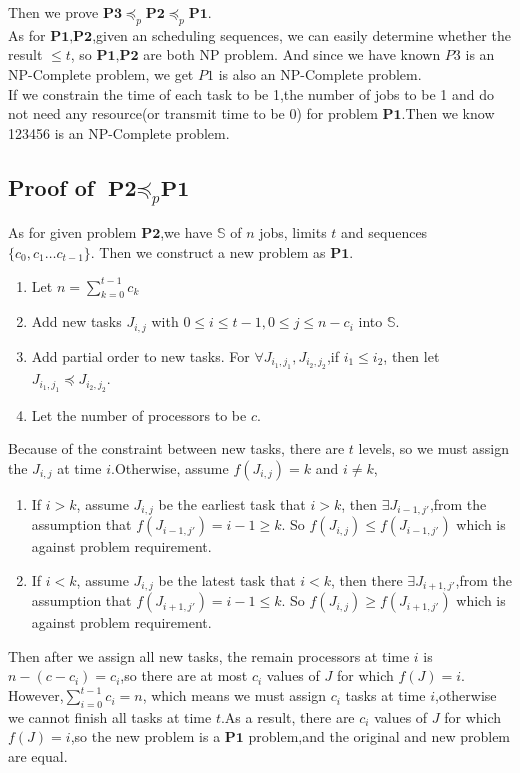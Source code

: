  Then we prove $\textbf{P3}\preceq_p \textbf{P2}\preceq_p\textbf{P1}$.\\As for $\textbf{P1,P2}$,given an scheduling sequences, we can easily determine whether the result $\le t$, so $\textbf{P1,P2}$ are both NP problem. And since we have known $P3$ is an NP-Complete problem, we get $P1$ is also an NP-Complete problem.\\
 If we constrain the time of each task to be 1,the number of jobs to be 1 and do not need any resource(or transmit time to be 0) for problem $\textbf{P1}$.Then we know 123456 is an NP-Complete problem.
\subsection{Proof of $\textbf{P2}\preceq_p \textbf{P1}$}
As for given problem $\textbf{P2}$,we have $\mathbb{S}$ of $n$ jobs, limits $t$ and sequences $\{c_0,c_1\dots c_{t-1}\}$. Then we construct a new problem as $\textbf{P1}$.
\begin{enumerate}
    \item Let $n=\sum\limits_{k=0}^{t-1}c_k$
    \item Add new tasks $J_{i,j}$ with $0\le i\le t-1,0\le j\le n-c_i$ into $\mathbb{S}$.
    \item Add partial order to new tasks. For $\forall J_{i_1,j_1}, J_{i_2,j_2}$,if $i_1\le i_2$, then let $J_{i_1,j_1}\preceq J_{i_2,j_2}$.
    \item Let the number of processors to be $c$.
\end{enumerate}
Because of the constraint between new tasks, there are $t$ levels, so we must assign the $J_{i,j}$ at time $i$.Otherwise, assume $f(J_{i,j})=k$ and $i\neq k$,
\begin{enumerate}
    \item If $i>k$, assume $J_{i,j}$ be the earliest task that $i>k$, then $\exists J_{i-1,j'}$,from the assumption that $f(J_{i-1,j'})=i-1\ge k$. So $f(J_{i,j})\le f(J_{i-1,j'})$ which is against problem requirement.
    \item If $i<k$, assume $J_{i,j}$ be the latest  task that $i<k$, then there $\exists J_{i+1,j'}$,from the assumption that $f(J_{i+1,j'})=i-1\le k$. So $f(J_{i,j})\ge f(J_{i+1,j'})$ which is against problem requirement.
\end{enumerate}
Then after we assign all new tasks, the remain processors at time $i$ is $n-(c-c_i)=c_i$,so there are at most $c_i$ values of $J$ for which $f(J)=i$. However,$\sum\limits_{i=0}^{t-1}c_i=n$, which means we must assign $c_i$ tasks at time $i$,otherwise we cannot finish all tasks at time $t$.As a result, there are $c_i$ values of $J$ for which $f(J)=i$,so the new problem is a $\textbf{P1}$ problem,and the original and new problem are equal.
